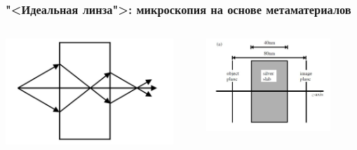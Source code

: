 \documentclass[9pt, compress, xcolor=table]{beamer}
\begin{document}
\begin{frame}[fragile]
\frametitle{"<Идеальная линза">: микроскопия на основе метаматериалов}

\begin{columns}[c]

\column{4cm}
\begin{center}
\includegraphics[width=0.9\textwidth]{pendry1}
\end{center}
\column{4cm}
\begin{center}
\includegraphics[width=0.9\textwidth]{pendry2}
\end{center}
\column{4cm}
\begin{center}

\end{center}
\end{columns}
\end{frame}
\end{document}
